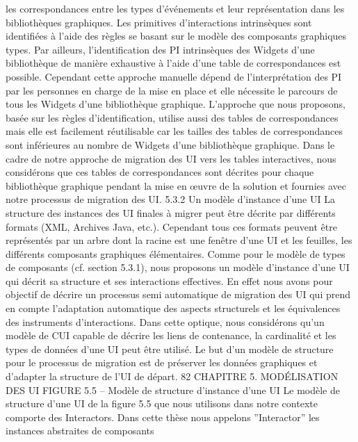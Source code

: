 \documentclass{article}
\begin{document}
les correspondances entre les types d’\'{e}v\'{e}nements et leur repr\'{e}sentation dans les biblioth\`{e}ques graphiques.
Les primitives d’interactions intrins\`{e}ques sont identiﬁ\'{e}es \`{a} l’aide des r\`{e}gles se basant sur le mod\`{e}le des composants graphiques types. Par ailleurs, l’identiﬁcation des PI intrins\`{e}ques des Widgets
d’une biblioth\`{e}que de mani\`{e}re exhaustive \`{a} l’aide d’une table de correspondances est possible. Cependant cette approche manuelle d\'{e}pend de l’interpr\'{e}tation des PI par les personnes en charge de la mise
en place et elle n\'{e}cessite le parcours de tous les Widgets d’une biblioth\`{e}que graphique. L’approche que
nous proposons, bas\'{e}e sur les r\`{e}gles d’identiﬁcation, utilise aussi des tables de correspondances mais
elle est facilement r\'{e}utilisable car les tailles des tables de correspondances sont inf\'{e}rieures au nombre
de Widgets d’une biblioth\`{e}que graphique. Dans le cadre de notre approche de migration des UI vers
les tables interactives, nous consid\'{e}rons que ces tables de correspondances sont d\'{e}crites pour chaque
biblioth\`{e}que graphique pendant la mise en œuvre de la solution et fournies avec notre processus de
migration des UI.
5.3.2
Un mod\`{e}le d’instance d’une UI
La structure des instances des UI ﬁnales \`{a} migrer peut \^{e}tre d\'{e}crite par diff\'{e}rents formats (XML,
Archives Java, etc.). Cependant tous ces formats peuvent \^{e}tre repr\'{e}sent\'{e}s par un arbre dont la racine
est une fen\^{e}tre d’une UI et les feuilles, les diff\'{e}rents composants graphiques \'{e}l\'{e}mentaires.
Comme pour le mod\`{e}le de types de composants (cf. section 5.3.1), nous proposons un mod\`{e}le
d’instance d’une UI qui d\'{e}crit sa structure et ses interactions effectives. En effet nous avons pour objectif de d\'{e}crire un processus semi automatique de migration des UI qui prend en compte l’adaptation
automatique des aspects structurels et les \'{e}quivalences des instruments d’interactions. Dans cette optique, nous consid\'{e}rons qu’un mod\`{e}le de CUI capable de d\'{e}crire les liens de contenance, la cardinalit\'{e}
et les types de donn\'{e}es d’une UI peut \^{e}tre utilis\'{e}. Le but d’un mod\`{e}le de structure pour le processus
de migration est de pr\'{e}server les donn\'{e}es graphiques et d’adapter la structure de l’UI de d\'{e}part.
82
CHAPITRE 5. MODÉLISATION DES UI
FIGURE 5.5 – Mod\`{e}le de structure d’instance d’une UI
Le mod\`{e}le de structure d’une UI de la ﬁgure 5.5 que nous utilisons dans notre contexte comporte
des Interactors. Dans cette th\`{e}se nous appelons ”Interactor” les instances abstraites de composants
\end{document}
